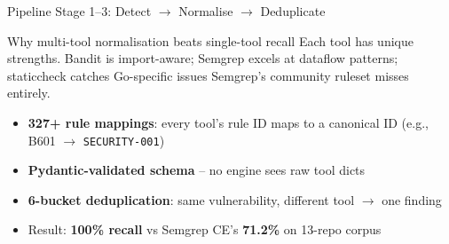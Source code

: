 \documentclass[aspectratio=169,12pt]{beamer}
\newcommand{\bad}[1]{\textbf{\color{acrRed}#1}}
\newcommand{\good}[1]{\textbf{\color{acrGreen}#1}}
\begin{document}
\begin{frame}{Pipeline Stage 1--3: Detect \(\rightarrow\) Normalise \(\rightarrow\) Deduplicate}
  \begin{exampleblock}{Why multi-tool normalisation beats single-tool recall}
    Each tool has unique strengths. Bandit is import-aware; Semgrep excels at
    dataflow patterns; staticcheck catches Go-specific issues Semgrep's
    community ruleset misses entirely.
  \end{exampleblock}

  \vspace{6pt}
  \begin{itemize}
    \item \textbf{327+ rule mappings}: every tool's rule ID maps to a
          canonical ID (e.g., B601 \(\rightarrow\) \texttt{SECURITY-001})
    \item \textbf{Pydantic-validated schema} -- no engine sees raw tool dicts
    \item \textbf{6-bucket deduplication}: same vulnerability, different tool \(\rightarrow\) one finding
    \item Result: \good{100\% recall} vs Semgrep CE's \bad{71.2\%} on 13-repo corpus
  \end{itemize}
\end{frame}
\end{document}
